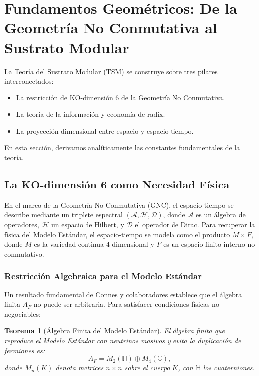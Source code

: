 \documentclass[11pt, a4paper]{article}
\theoremstyle{plain}
\newtheorem{teorema}{Teorema}[section]
\theoremstyle{definition}
\begin{document}

\section{Fundamentos Geométricos: De la Geometría No Conmutativa al Sustrato Modular}
\label{sec:fundamentos}

La Teoría del Sustrato Modular (TSM) se construye sobre tres pilares interconectados:

\begin{itemize}
    \item La restricción de KO-dimensión 6 de la Geometría No Conmutativa.
    \item La teoría de la información y economía de radix.
    \item La proyección dimensional entre espacio y espacio-tiempo.
\end{itemize}

En esta sección, derivamos analíticamente las constantes fundamentales de la teoría.

\subsection{La KO-dimensión 6 como Necesidad Física}

En el marco de la Geometría No Conmutativa (GNC), el espacio-tiempo se describe mediante un triplete espectral $(\mathcal{A}, \mathcal{H}, \mathcal{D})$, donde $\mathcal{A}$ es un álgebra de operadores, $\mathcal{H}$ un espacio de Hilbert, y $\mathcal{D}$ el operador de Dirac. Para recuperar la física del Modelo Estándar, el espacio-tiempo se modela como el producto $M \times F$, donde $M$ es la variedad continua 4-dimensional y $F$ es un espacio finito interno no conmutativo.

\subsubsection{Restricción Algebraica para el Modelo Estándar}

Un resultado fundamental de Connes y colaboradores \cite{Connes2012, Chamseddine2012} establece que el álgebra finita $A_F$ no puede ser arbitraria. Para satisfacer condiciones físicas no negociables:

\begin{teorema}[Álgebra Finita del Modelo Estándar]
El álgebra finita que reproduce el Modelo Estándar con neutrinos masivos y evita la duplicación de fermiones es:
\begin{equation}
A_F = M_2(\mathbb{H}) \oplus M_4(\mathbb{C}),
\end{equation}
donde $M_n(K)$ denota matrices $n\times n$ sobre el cuerpo $K$, con $\mathbb{H}$ los cuaterniones.
\end{teorema}
\end{document}
